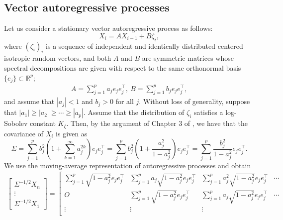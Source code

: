 \documentclass[11pt,a4paper]{article}
\theoremstyle{remark}
\theoremstyle{definition}
\newcommand{\bX}{X}
\newcommand{\be}{e}
\newcommand{\bzeta}{\zeta}
\newcommand{\bfA}{A}
\newcommand{\bfB}{B}
\newcommand{\bfO}{O}
\newcommand{\bSigma}{\Sigma}
\newcommand{\R}{\mathbb{R}}
\theoremstyle{definition}
\begin{document}
\begin{bibunit}[apalike]
\subsection{Vector autoregressive processes}\label{corr:sec:example:var}
Let us consider a stationary vector autoregressive process as follows:
\begin{equation*}
    \bX_{i}=\bfA\bX_{i-1}+\bfB\bzeta_{i},
\end{equation*}
where $(\bzeta_{i})_{i}$ is a sequence of independent and identically distributed centered isotropic random vectors, and both $\bfA$ and $\bfB$ are symmetric matrices whose spectral decompositions are given with respect to the same orthonormal basis $\{\be_{j}\}\subset\R^{p}$;
\begin{align*}
    \bfA=\sum_{j=1}^{p}a_{j}\be_{j}\be_{j}^{\top},\ \bfB=\sum_{j=1}^{p}b_{j}\be_{j}\be_{j}^{\top},
\end{align*}
and assume that $|a_{j}|<1$ and $b_{j}>0$ for all $j$. 
Without loss of generality, suppose that $|a_{1}|\ge |a_{2}|\ge\cdots\ge |a_{p}|$.
Assume that the distribution of $\bzeta_{i}$ satisfies a log-Sobolev constant $K_{\bzeta}$.
Then, by the argument of Chapter 3 of \citet{bosq2000linear}, we have that the covariance of $\bX_{i}$ is given as
\begin{equation*}
    \bSigma=\sum_{j=1}^{p}b_{j}^{2}\left(1+\sum_{k=1}^{\infty}a_{j}^{2k}\right)\be_{j}\be_{j}^{\top}=\sum_{j=1}^{p}b_{j}^{2}\left(1+\frac{a_{j}^{2}}{1-a_{j}^{2}}\right)\be_{j}\be_{j}^{\top}=\sum_{j=1}^{p}\frac{b_{j}^{2}}{1-a_{j}^{2}}\be_{j}\be_{j}^{\top}.
\end{equation*}
We use the moving-average representation of autoregressive processes and obtain
\begin{align*}
    \left[\begin{matrix}
        \bSigma^{-1/2}\bX_{n}\\
        \vdots\\
        \bSigma^{-1/2}\bX_{1}
    \end{matrix}\right]=\left[\begin{matrix}
        \sum_{j=1}^{p}\sqrt{1-a_{j}^{2}}\be_{j}\be_{j}^{\top} & \sum_{j=1}^{p}a_{j}\sqrt{1-a_{j}^{2}}\be_{j}\be_{j}^{\top} & \sum_{j=1}^{p}a_{j}^{2}\sqrt{1-a_{j}^{2}}\be_{j}\be_{j}^{\top}  & \cdots \\
        \bfO & \sum_{j=1}^{p}\sqrt{1-a_{j}^{2}}\be_{j}\be_{j}^{\top} & \sum_{j=1}^{p}a_{j}\sqrt{1-a_{j}^{2}}\be_{j}\be_{j}^{\top}  & \cdots\\
        \vdots & \vdots & \vdots & \\

\end{matrix}
\end{align*}
\end{bibunit}
\end{document}
